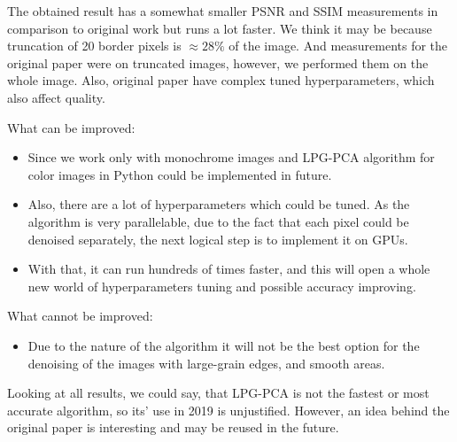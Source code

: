 The obtained result has a somewhat smaller PSNR and SSIM measurements in comparison to original work but runs a lot faster. We think it may be because truncation of 20 border pixels is $\approx 28\%$ of the image. And measurements for the original paper were on truncated images, however, we performed them on the whole image. Also, original paper have complex tuned hyperparameters, which also affect quality.

What can be improved:

\begin{itemize}
    \item Since we work only with monochrome images and LPG-PCA algorithm for color images in Python could be implemented in future. 
    \item Also, there are a lot of hyperparameters which could be tuned. As the algorithm is very parallelable, due to the fact that each pixel could be denoised separately, the next logical step is to implement it on GPUs. 
    \item With that, it can run hundreds of times faster, and this will open a whole new world of hyperparameters tuning and possible accuracy improving.
\end{itemize}

What cannot be improved:

\begin{itemize}
    \item Due to the nature of the algorithm it will not be the best option for the denoising of the images with large-grain edges, and smooth areas.
\end{itemize}

Looking at all results, we could say, that LPG-PCA is not the fastest or most accurate algorithm, so its’ use in 2019 is unjustified. However, an idea behind the original paper is interesting and may be reused in the future.



